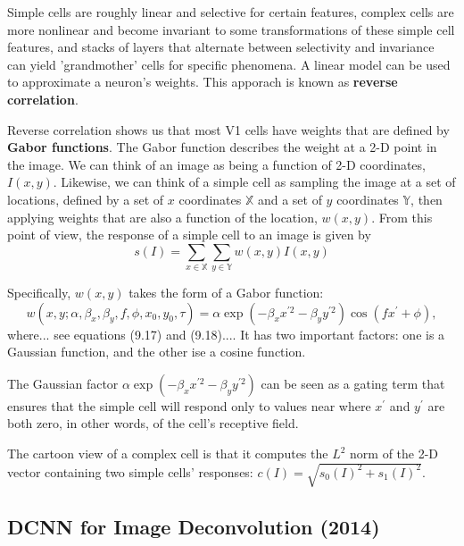 \documentclass[12pt]{article}
\begin{document}
Simple cells are roughly linear and selective for certain features,
complex cells are more nonlinear and become invariant to some
transformations of these simple cell features, and stacks of
layers that alternate between selectivity and invariance can yield
'grandmother' cells for specific phenomena. A linear model can be
used to approximate a neuron's weights. This apporach is known as
\textbf{reverse correlation}. \newline

Reverse correlation shows us that most V1 cells have weights that
are defined by \textbf{Gabor functions}. The Gabor function describes
the weight at a 2-D point in the image. We can think of an image as
being a function of 2-D coordinates, $I(x,y)$. Likewise, we can
think of a simple cell as sampling the image at a set of locations,
defined by a set of $x$ coordinates $\mathbb{X}$ and a set of $y$
coordinates $\mathbb{Y}$, then applying weights that are also a
function of the location, $w(x,y)$. From this point of view, the
response of a simple cell to an image is given by
\[
s(I) = \sum_{x \in \mathbb{X}} \sum_{y \in \mathbb{Y}} w(x,y)I(x,y)
\tag{9.15}
\]

Specifically, $w(x,y)$ takes the form of a Gabor function:
\[
w(x,y;\alpha, \beta_x, \beta_y, f, \phi, x_0, y_0, \tau) =
\alpha \exp(-\beta_x x^{\prime 2} - \beta_y y^{\prime 2})
\cos(f x^{\prime} + \phi), \tag{9.16}
\]
where... see equations (9.17) and (9.18).... It has two important
factors: one is a Gaussian function, and the other ise a cosine
function. \newline

The Gaussian factor $\alpha \exp(-\beta_x x^{\prime 2} - \beta_y y^{\prime 2})$
can be seen as a gating term that ensures that the simple cell will
respond only to values near where $x^\prime$ and $y^\prime$ are both
zero, in other words,  of the cell's receptive
field. \newline

The cartoon view of a complex cell is that it computes the $L^2$ norm of
the 2-D vector containing two simple cells' responses:
$c(I) = \sqrt{s_0(I)^2 + s_1(I)^2}$.

\subsection{DCNN for Image Deconvolution \cite{xu2014deep} (2014)}
\end{document}
